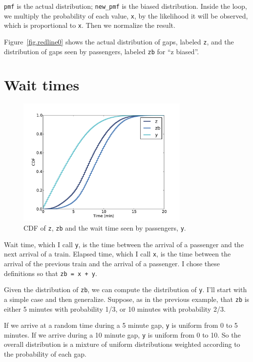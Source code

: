 \documentclass[12pt]{book}
\begin{document}
{\tt pmf} is the actual distribution; \verb"new_pmf" is the
biased distribution.  Inside the loop, we multiply the
probability of each value, {\tt x}, by the likelihood it will
be observed, which is proportional to {\tt x}.  Then we
normalize the result.

Figure~\ref{fig.redline0} shows the actual distribution of gaps,
labeled {\tt z}, and the distribution of gaps seen by passengers,
labeled {\tt zb} for ``z biased''.


\section{Wait times}

\begin{figure}
\centerline{\includegraphics[height=2.5in]{figs/redline2.pdf}}
\caption{CDF of {\tt z}, {\tt zb} and the wait time seen
by passengers, {\tt y}. }
\label{fig.redline2}
\end{figure}

Wait time, which I call {\tt y}, is the time between the arrival
of a passenger and the next arrival of a train.  Elapsed time, which I
call {\tt x}, is the time between the arrival of the previous
train and the arrival of a passenger.  I chose these definitions
so that {\tt zb = x + y}.

Given the distribution of {\tt zb}, we can compute the distribution of
{\tt y}.  I'll start with a simple case and then generalize.
Suppose, as in the previous example, that {\tt zb} is either 5 minutes
with probability 1/3, or 10 minutes with probability 2/3.

If we arrive at a random time during a 5 minute gap, 
{\tt y} is uniform from 0 to 5 minutes.  If we arrive during a 10
minute gap, {\tt y} is uniform from 0 to 10.  So the overall
distribution is a mixture of uniform distributions weighted
according to the probability of each gap.
\end{document}
